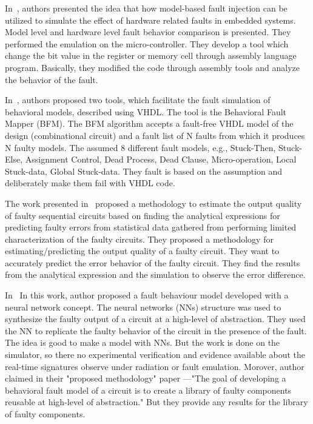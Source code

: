 In~\citep{svenningsson2010model}, authors presented the idea that how model-based fault injection can be utilized to
simulate the effect of hardware related faults in embedded systems. Model level and hardware level
fault behavior comparison is presented. They performed the emulation on the micro-controller. They develop a tool which change the bit value in the register or memory cell through assembly language program. Basically, they modified the code through assembly tools and analyze the behavior of the fault.

In~\citep{hayne1999behavioral}, authors proposed two tools, which facilitate the fault simulation of behavioral
models, described using VHDL. The tool is the Behavioral Fault Mapper (BFM). The BFM algorithm
accepts a fault-free VHDL model of the design (combinational circuit) and a fault list of N faults from
which it produces N faulty models. The assumed 8 different fault models, e.g., Stuck-Then, Stuck-Else,
Assignment Control, Dead Process, Dead Clause, Micro-operation, Local Stuck-data, Global Stuck-data. They fault is based on the assumption and deliberately make them fail with VHDL code. 

The work presented in~\citep{kapare2016automated} proposed a methodology to estimate the output quality of faulty
sequential circuits based on finding the analytical expressions for predicting
faulty errors from statistical data gathered from performing limited characterization of the faulty circuits. They proposed a methodology for estimating/predicting the output
quality of a faulty circuit. They want to accurately predict the error behavior of the faulty circuit. They find the results from the analytical expression and the simulation to observe the error difference.

In~\citep{mirzadeh2014modeling} In this work, author proposed a fault behaviour model developed with a neural network
concept. The neural networks (NNs) structure was used to synthesize the faulty output of a
circuit at a high-level of abstraction. They used the NN to replicate the faulty behavior of the circuit in the presence of the fault. The idea is good to make a model with NNs. But the work is done on the simulator, so there no experimental verification and evidence available about the real-time signatures observe under radiation or fault emulation. Morover, author claimed in their "proposed methodology" paper ---"The goal of developing a behavioral fault model of a circuit is to create a library of faulty components reusable at high-level of abstraction." But they provide any results for the library of faulty components.


